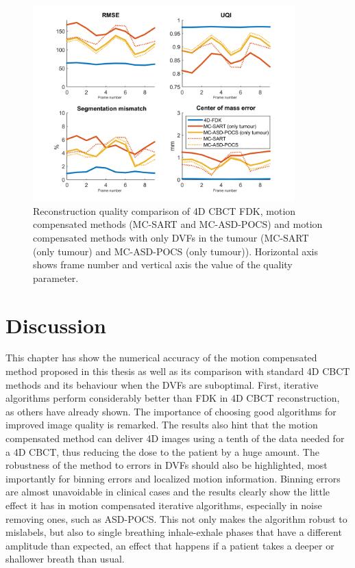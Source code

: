 \begin{figure}
\begin{center}

\includegraphics[width=0.9\textwidth]{accuracyMC/tumourMCCBCTparams.png} 


\end{center}

\caption[Reconstruction quality comparison of motion compensation]{\label{fig:tumourMCCBCTquality}  Reconstruction quality comparison of 4D CBCT FDK, motion compensated methods (MC-SART and MC-ASD-POCS) and motion compensated methods with only DVFs in the tumour (MC-SART (only tumour) and MC-ASD-POCS (only tumour)). Horizontal axis shows frame number and vertical axis the value of the quality parameter.} 
\end{figure}

\FloatBarrier
\section{Discussion}

This chapter has show the numerical accuracy of the motion compensated method proposed in this thesis as well as its comparison with standard 4D CBCT methods and its behaviour when the DVFs are suboptimal. First, iterative algorithms perform considerably better than FDK in 4D CBCT reconstruction, as others have already shown. The importance of choosing good algorithms for improved image quality is remarked. The results also hint that the motion compensated method can deliver 4D images using a tenth of the data needed for a 4D CBCT, thus reducing the dose to the patient by a huge amount. The robustness of the method to errors in DVFs should also be  highlighted, most importantly for binning errors and localized motion information. Binning errors are almost unavoidable in clinical cases and the results clearly show the little effect it has in motion compensated iterative algorithms, especially in noise removing ones, such as ASD-POCS. This not only makes the algorithm robust to mislabels, but also to single breathing inhale-exhale phases that have a different amplitude than expected, an effect that happens if a patient takes a deeper or shallower breath than usual. 

